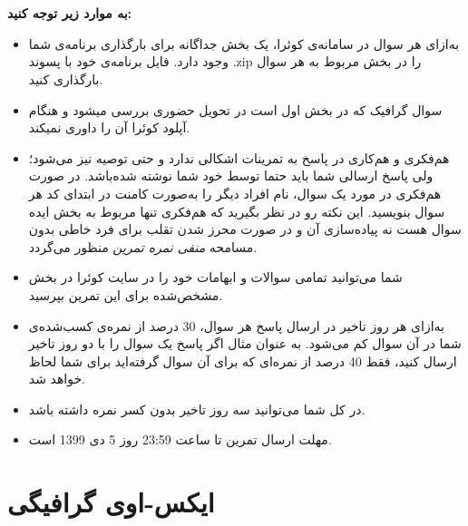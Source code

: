 \documentclass[]{article}
\begin{document}
\newpage
\pagestyle{fancy}
\fancyhf{}
\fancyfoot{}
\cfoot{\thepage}




 \Large \textbf{\\\\
به موارد زیر توجه کنید:}

\begin{itemize}[label=$\ast$]
\item به‌ازای هر سوال در سامانه‌ی کوئرا، یک بخش جداگانه برای بارگذاری برنامه‌ی شما وجود دارد. فایل برنامه‌ی خود با پسوند .zip را در بخش مربوط به هر سوال بارگذاری کنید.

\item سوال گرافیک که در بخش اول است در تحویل حضوری بررسی میشود و هنگام آپلود کوئرا آن را داوری نمیکند.
\item هم‌فکری و هم‌کاری در پاسخ به تمرینات اشکالی ندارد و حتی توصیه نیز می‌شود؛ ولی پاسخ ارسالی شما باید حتما توسط خود شما نوشته شده‌باشد. در صورت هم‌فکری در مورد یک سوال، نام افراد دیگر را به‌صورت کامنت در ابتدای کد هر سوال بنویسید.  این نکته رو در نظر بگیرید که هم‌فکری تنها مربوط به بخش ایده سوال هست نه پیاده‌سازی آن و در صورت محرز شدن تقلب برای فرد خاطی بدون مسامحه \emph{ منفی نمره تمرین}
منظور می‌گردد. 
\item شما می‌توانید تمامی سوالات و ابهامات خود را در سایت کوئرا در بخش مشخص‌شده برای این تمرین بپرسید.
\item به‌ازای هر روز تاخیر در ارسال پاسخ هر سوال، 30 درصد از نمره‌ی کسب‌شده‌ی شما در آن سوال کم می‌شود. به عنوان مثال اگر پاسخ یک سوال را با دو روز تاخیر ارسال کنید، فقط 40 درصد از نمره‌ای که برای آن سوال گرفته‌اید برای شما لحاظ خواهد شد.
\item در کل شما می‌توانید سه روز تاخیر بدون کسر نمره داشته باشد.
\item مهلت ارسال تمرین تا ساعت 23:59 روز 5 دی 1399 است.
\end{itemize}




\newpage




\section{ایکس-اوی گرافیگی}
\end{document}
